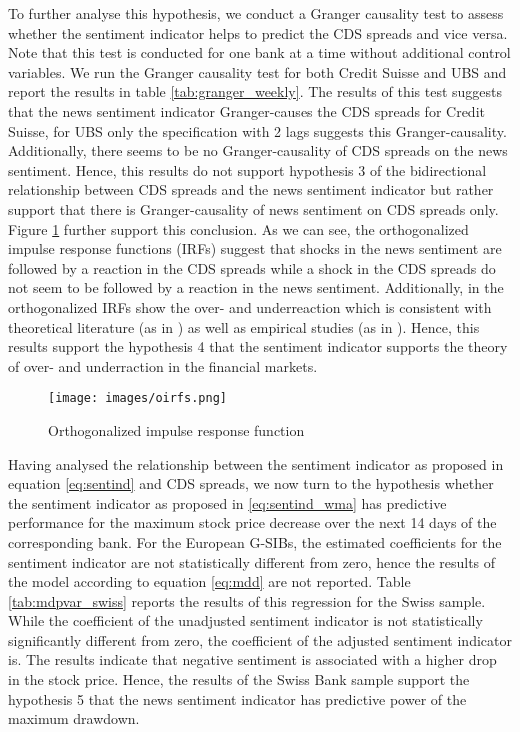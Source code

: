 

To further analyse this hypothesis, we conduct a Granger causality test to assess whether the sentiment indicator helps to predict the CDS spreads and vice versa. Note that this test is conducted for one bank at a time without additional control variables. We run the Granger causality test for both Credit Suisse and UBS and report the results in table \ref{tab:granger_weekly}. The results of this test suggests that the news sentiment indicator Granger-causes the CDS spreads for Credit Suisse, for UBS only the specification with 2 lags suggests this Granger-causality. Additionally, there seems to be no Granger-causality of CDS spreads on the news sentiment. Hence, this results do not support hypothesis 3 of the bidirectional relationship between CDS spreads and the news sentiment indicator but rather support that there is Granger-causality of news sentiment on CDS spreads only. \\



Figure \ref{fig:oirfs} further support this conclusion. As we can see, the orthogonalized impulse response functions (IRFs) suggest that shocks in the news sentiment are followed by a reaction in the CDS spreads while a shock in the CDS spreads do not seem to be followed by a reaction in the news sentiment. Additionally, in the orthogonalized IRFs show the over- and underreaction which is consistent with theoretical literature (as in \cite{debondt1985}) as well as empirical studies (as in \cite{cathcart2020}). Hence, this results support the hypothesis 4 that the sentiment indicator supports the theory of over- and underraction in the financial markets. \\

\begin{figure}[h!]
    \centering
    \texttt{[image: images/oirfs.png]}
    \caption{Orthogonalized impulse response function}
    \label{fig:oirfs}
\end{figure}


Having analysed the relationship between the sentiment indicator as proposed in equation \ref{eq:sentind} and CDS spreads, we now turn to the hypothesis whether the sentiment indicator as proposed in \ref{eq:sentind_wma} has predictive performance for the maximum stock price decrease over the next 14 days of the corresponding bank. For the European G-SIBs, the estimated coefficients for the sentiment indicator are not statistically different from zero, hence the results of the model according to equation \ref{eq:mdd} are not reported. Table \ref{tab:mdpvar_swiss} reports the results of this regression for the Swiss sample. While the coefficient of the unadjusted sentiment indicator is not statistically significantly different from zero, the coefficient of the adjusted sentiment indicator is. The results indicate that negative sentiment is associated with a higher drop in the stock price. Hence, the results of the Swiss Bank sample support the hypothesis 5 that the news sentiment indicator has predictive power of the maximum drawdown. \\

